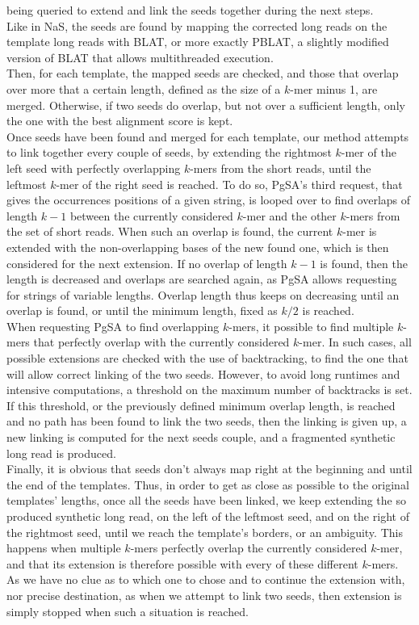 \documentclass[twoside,twocolumn]{article}
\begin{document}
being queried to extend and link the seeds together during the next steps. \\
\indent Like in NaS, the seeds are found by mapping the corrected long reads on the template long reads with BLAT, or more exactly PBLAT, a slightly modified version of BLAT that allows multithreaded execution. \\
\indent Then, for each template, the mapped seeds are checked, and those that overlap over more that a certain length, defined as the size of a $k$-mer minus 1, are merged. Otherwise, if two seeds do overlap, but not over a sufficient length, only the one with the best alignment score is kept. \\
\indent Once seeds have been found and merged for each template, our method attempts to link together every couple of seeds, by extending the rightmost $k$-mer of the left seed with perfectly overlapping $k$-mers from the short reads, until the leftmost $k$-mer of the right seed is reached. To do so, PgSA's third request, that gives the occurrences positions of a given string, is looped over to find overlaps of length $k - 1$ between the currently 
considered $k$-mer and the other $k$-mers from the set of short reads. When such an overlap is found, the current $k$-mer is extended
with the non-overlapping bases of the new found one, which is then considered for the next extension. If no overlap of length $k - 1$ is found, then the length is decreased and overlaps are searched again, as PgSA allows requesting for strings of variable lengths. Overlap length thus keeps on decreasing until an overlap is found, or until the minimum length, fixed as $k / 2$ is reached. \\
\indent When requesting PgSA to find overlapping $k$-mers, it possible to find multiple $k$-mers that perfectly overlap with the currently considered $k$-mer. In such cases, all possible extensions are checked with the use of backtracking, to find the one that will allow correct linking of the two seeds. However, to avoid long runtimes and intensive computations, a threshold on the maximum number of backtracks is set. If this threshold, or the previously defined minimum overlap length, is reached and no path has been found to link the two seeds, then the linking is given up, a new linking is computed for the next seeds couple, and a fragmented synthetic long read is produced. \\
\indent Finally, it is obvious that seeds don't always map right at the beginning and until the end of the templates. Thus, in order to get as close as possible to the original templates' lengths, once all the seeds have been linked, we keep extending the so produced synthetic long read, on the left of the leftmost seed, and on the right of the rightmost seed, until we reach the template's borders, or an ambiguity. This happens when multiple $k$-mers perfectly
overlap the currently considered $k$-mer, and that its extension is therefore possible with every of these different $k$-mers. As we have no clue as to which one to chose and to continue the extension with, nor precise destination, as when we attempt to link two seeds, then extension is simply stopped when such a situation is reached. 
\end{document}

